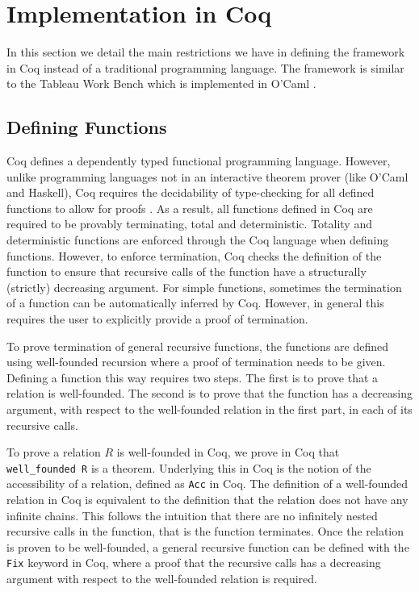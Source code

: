 \documentclass{llncs}
\begin{document}
\section{Implementation in Coq}
%
In this section we detail the main restrictions we have in defining the
framework in Coq instead of a traditional programming language. The framework
is similar to the Tableau Work Bench which is implemented in O'Caml
\cite{abate2007tableau, kelly2009revised}.
%
\subsection{Defining Functions} \label{Defining Functions}
%
Coq defines a dependently typed functional programming language. However,
unlike programming languages not in an interactive theorem prover (like O'Caml
and Haskell), Coq requires the decidability of type-checking for all defined
functions to allow for proofs \cite{barthe2006defining}. As a result, all
functions defined in Coq are required to be provably terminating, total and
deterministic. Totality and deterministic functions are enforced through the
Coq language when defining functions. However, to enforce termination, Coq
checks the definition of the function to ensure that recursive calls of the
function have a structurally (strictly) decreasing argument. For simple
functions, sometimes the termination of a function can be automatically
inferred by Coq. However, in general this requires the user to explicitly
provide a proof of termination.

To prove termination of general recursive functions, the functions are defined
using well-founded recursion where a proof of termination needs to be given.
Defining a function this way requires two steps. The first is to prove that a
relation is well-founded. The second is to prove that the function has a
decreasing argument, with respect to the well-founded relation in the first
part, in each of its recursive calls.

To prove a relation $R$ is well-founded in Coq, we prove in Coq that
\\\verb+well_founded R+ is a theorem. Underlying this in Coq is the notion of
the accessibility of a relation, defined as \verb+Acc+ in Coq.  The definition
of a well-founded relation in Coq is equivalent to the definition that the
relation does not have any infinite chains. This follows the intuition that
there are no infinitely nested recursive calls in the function, that is the
function terminates. Once the relation is proven to be well-founded, a general
recursive function can be defined with the \verb+Fix+ keyword in Coq, where a
proof that the recursive calls has a decreasing argument with respect to the
well-founded relation is required.
\end{document}
